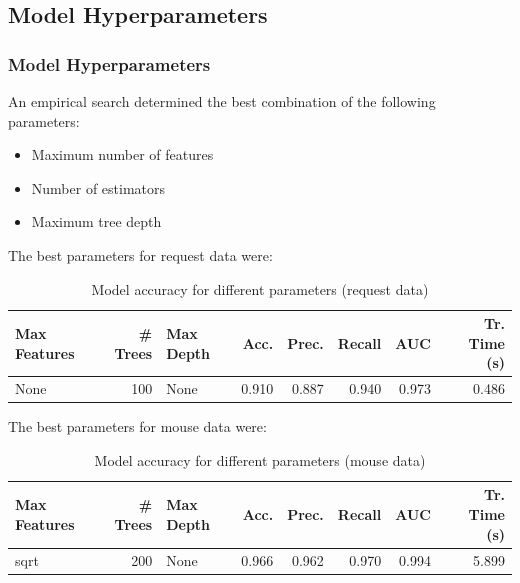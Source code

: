 \documentclass[t,aspectratio=169,table]{beamer}
\begin{document}
\subsection{Model Hyperparameters}
\begin{frame}
\frametitle{Model Hyperparameters}

An empirical search determined the best combination of the following parameters:

\begin{itemize}
    \item Maximum number of features
    \item Number of estimators
    \item Maximum tree depth
\end{itemize}
The best parameters for request data were:
\begin{table}
    \begin{center}
        \begin{tabular}{lrlrrrrr}
            Max Features & \# Trees & Max Depth & Acc. & Prec. & Recall & AUC & Tr. Time (s) \\
            \midrule
            None & 100 & None & 0.910 & 0.887 & 0.940 & 0.973 & 0.486 \\
        \end{tabular}
    \end{center}
    \caption{Model accuracy for different parameters (request data)}
    \label{table:request_params}
\end{table}
The best parameters for mouse data were:
\begin{table}
    \begin{center}
        \begin{tabular}{lrlrrrrr}
            Max Features & \# Trees & Max Depth & Acc. & Prec. & Recall & AUC & Tr. Time (s) \\
            \midrule
            \rowcolor{green!30}
            sqrt & 200 & None & 0.966 & 0.962 & 0.970 & 0.994 & 5.899 \\
        \end{tabular}
    \end{center}
    \caption{Model accuracy for different parameters (mouse data)}
    \label{table:mouse_params}
\end{table}

\end{frame}
\end{document}
